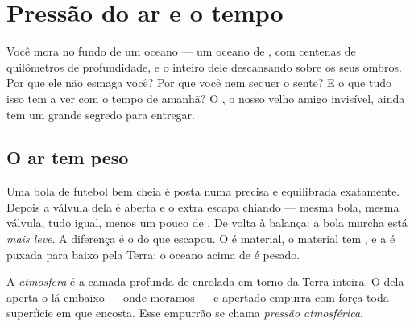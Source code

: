 \chapter{Pressão do ar e o tempo}\label{ch:g5:air-pressure-weather}

Você mora no fundo de um oceano --- um oceano de , com centenas de
quilômetros de profundidade, e o  inteiro dele descansando sobre
os seus ombros. Por que ele não esmaga você? Por que você nem sequer
o sente? E o que tudo isso tem a ver com o tempo de amanhã? O , o
nosso velho amigo invisível, ainda tem um grande segredo para
entregar.

\section{O ar tem peso}

\begin{example}\label{ex:g5:air-pressure-weather:weighing}
Uma bola de futebol bem cheia é posta numa  precisa
e equilibrada exatamente. Depois a válvula dela é aberta e o  extra
escapa chiando --- mesma bola, mesma válvula, tudo igual, menos um
pouco de . De volta à balança: a bola murcha está \emph{mais leve}.
A diferença é o  do  que escapou. O  é material, o material
tem , e a  é puxada para baixo pela Terra: o oceano acima
de  é pesado.
\end{example}

\begin{definition}\label{def:g5:air-pressure-weather:pressure}
A \emph{atmosfera} é a camada profunda de 
enrolada em torno da Terra inteira. O  dela aperta o  lá
embaixo --- onde moramos --- e  apertado empurra com força toda
superfície em que encosta. Esse empurrão se chama \emph{pressão
atmosférica}.
\end{definition}


